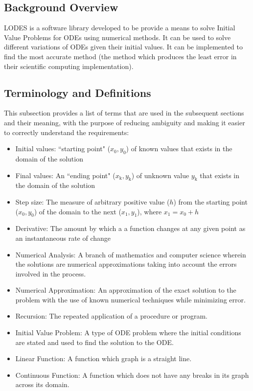 \documentclass[12pt]{article}
\newcommand{\famname}{LODES} %
\begin{document}
\subsection{Background Overview} \label{Sec_Background}
\famname{} is a software library developed to be provide a means to solve Initial Value
Problems for ODEs using numerical methods. It can be used to solve different variations of ODEs
given their initial values. It can be implemented to find the most accurate method (the method
which produces the least error in their scientific computing implementation).

\subsection{Terminology and  Definitions}

This subsection provides a list of terms that are used in the subsequent
sections and their meaning, with the purpose of reducing ambiguity and making it
easier to correctly understand the requirements:

\begin{itemize}

\item Initial values: ``starting point" ($x_\text{0}, y_\text{0}$) of known values that
exists in the domain of the solution

\item Final values: An ``ending point" ($x_\text{k}, y_\text{k}$) of unknown value $y_\text{k}$
that exists in the domain of the solution

\item Step size: The measure of arbitrary positive value ($h$) from the starting point
($x_\text{0}, y_\text{0}$) of the domain to the next ($x_\text{1}, y_\text{1}$), where
$x_\text{1} = x_\text{0} + h$

\item Derivative: The amount by which a a function changes at any given point as an
instantaneous rate of change

\item Numerical Analysis: A branch of mathematics and computer science wherein the solutions
are numerical approximations taking into account the errors involved in the process.

\item Numerical Approximation: An approximation of the exact solution to the problem with the
use of known numerical techniques while minimizing error.

\item Recursion: The repeated application of a procedure or program.

\item Initial Value Problem: A type of ODE problem where the initial conditions are stated and
used to find the solution to the ODE.

\item Linear Function: A function which graph is a straight line.

\item Continuous Function: A function which does not have any breaks in its graph across its domain.

\end{itemize}
\end{document}
